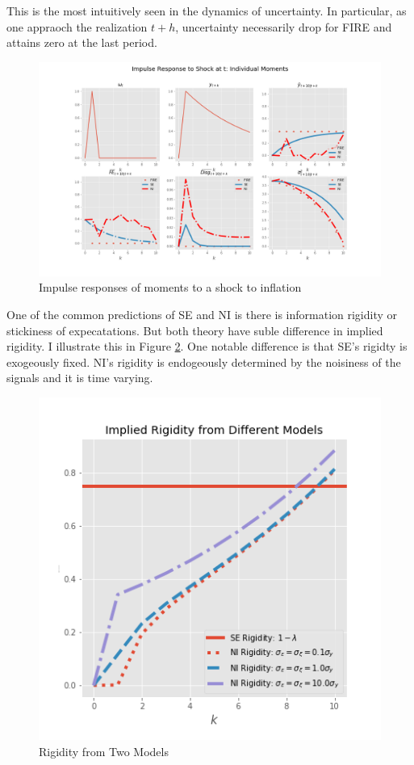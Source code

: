 \documentclass[]{article}
\begin{document}
This is the most intuitively seen in the dynamics of uncertainty. In particular, as one appraoch the realization $t+h$, uncertainty necessarily drop for FIRE and attains zero at the last period.  

\begin{figure}[h]\label{ir_pop}
	\centering
	\includegraphics[width=14cm]{figures/ir_popseni.png} 
	\caption{Impulse responses of moments to a shock to inflation}
\end{figure}

One of the common predictions of SE and NI is there is information rigidity or stickiness of expecatations.  But both theory have suble difference in implied rigidity. I illustrate this in Figure \ref{rigidity}. One notable difference is that SE's rigidty is exogeously fixed. NI's rigidity is endogeously determined by the noisiness of the signals and it is time varying. 
 
\begin{figure}[h]\label{rigidity}
	\centering
	\includegraphics[width=13cm]{figures/rigidity.png} 
	\caption{Rigidity from Two Models}
\end{figure}
\end{document}

